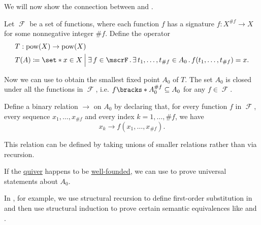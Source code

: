 \begin{remark}\label{rem:structural_recursion_and_induction}\mimprovised
  We will now show the connection between  and .

  Let \( \mscrF \) be a set of functions, where each function \( f \) has a signature \( f: X^{\#f} \to X \) for some nonnegative integer \( \#f \). Define the operator
  \begin{equation*}
    \begin{aligned}
      &T: \pow(X) \to \pow(X) \\
      &T(A) \coloneqq \set*{ x \in X \given[\Big] \qexists{f \in \mscrF} \qexists{t_1, \ldots, t_{\#f} \in A_0} f(t_1, \ldots, t_{\#f}) = x }.
    \end{aligned}
  \end{equation*}

  Now we can use  to obtain the smallest fixed point \( A_0 \) of \( T \). The set \( A_0 \) is closed under all the functions in \( \mscrF \), i.e. \( f\bracks*{ A_0^{\#f} } \subseteq A_0 \) for any \( f \in \mscrF \).

  Define a binary relation \( \to \) on \( A_0 \) by declaring that, for every function \( f \) in \( \mscrF \), every sequence \( x_1, \ldots, x_{\#f} \) and every index \( k = 1, \ldots, \#f \), we have
  \begin{equation*}
    x_k \to f(x_1, \ldots, x_{\#f}).
  \end{equation*}

  This relation can be defined by taking unions of smaller relations rather than via recursion.

  If the \hyperref[def:quiver]{quiver} happens to be \hyperref[def:well_founded_relation]{well-founded}, we can use  to prove universal statements about \( A_0 \).

  In , for example, we use structural recursion to define first-order substitution in  and then use structural induction to prove certain semantic equivalences like  and .
\end{remark}

